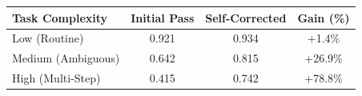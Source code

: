 \begin{tabular}{@{}lccc@{}}
\toprule
\textbf{Task Complexity} & \textbf{Initial Pass} & \textbf{Self-Corrected} & \textbf{Gain (\%)} \\ \midrule
Low (Routine) & 0.921 & 0.934 & +1.4\% \\
Medium (Ambiguous) & 0.642 & 0.815 & +26.9\% \\
High (Multi-Step) & 0.415 & 0.742 & +78.8\% \\ \bottomrule
\end{tabular}
